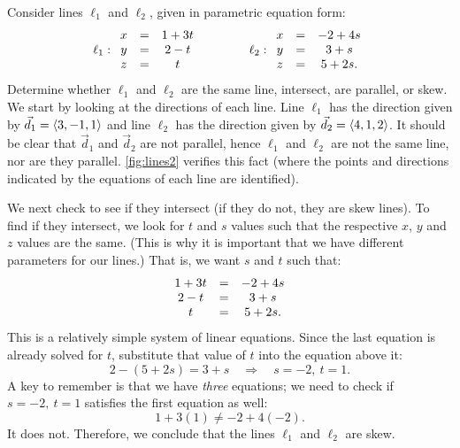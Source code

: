\begin{example}\label{ex_lines2}%
Consider lines $\ell_1$ and $\ell_2$, given in parametric equation form:
\[
\ell_1: \begin{array}{ c c c } x&=&1+3t \\ y&=&2-t\\z&=&t\end{array}
\qquad\qquad
\ell_2: \begin{array}{ c c c } x&=&-2+4s\\y&=&3+s\\z&=&5+2s.\end{array}
\]
Determine whether $\ell_1$ and $\ell_2$ are the same line, intersect, are parallel, or skew.
\solution
We start by looking at the directions of each line. Line $\ell_1$ has the direction given by $\vec d_1=\left\langle 3,-1,1\right\rangle$ and line $\ell_2$ has the direction given by $\vec d_2 =\left\langle 4,1,2\right\rangle$. It should be clear that $\vec d_1$ and $\vec d_2$ are not parallel, hence $\ell_1$ and $\ell_2$ are not the same line, nor are they parallel. \autoref{fig:lines2} verifies this fact (where the points and directions indicated by the equations of each line are identified).


We next check to see if they intersect (if they do not, they are skew lines). To find if they intersect, we look for $t$ and $s$ values such that the respective $x$, $y$ and $z$ values are the same. (This is why it is important that we have different parameters for our lines.) That is, we want $s$ and $t$ such that:
\[
\begin{array}{ c c c }
1+3t &=&-2+4s\\
2-t&=&3+s\\
t&=&5+2s.\end{array}
\]
This is a relatively simple system of linear equations. Since the last equation is already solved for $t$, substitute that value of $t$ into the equation above it:
\[2-(5+2s) = 3+s \quad \Rightarrow \quad s=-2,\ t=1.\]
A key to remember is that we have \emph{three} equations; we need to check if $s=-2,\ t=1$ satisfies the first equation as well:
\[1+3(1) \neq -2+4(-2).\]
It does not. Therefore, we conclude that the lines $\ell_1$ and $\ell_2$ are skew.
\end{example}

